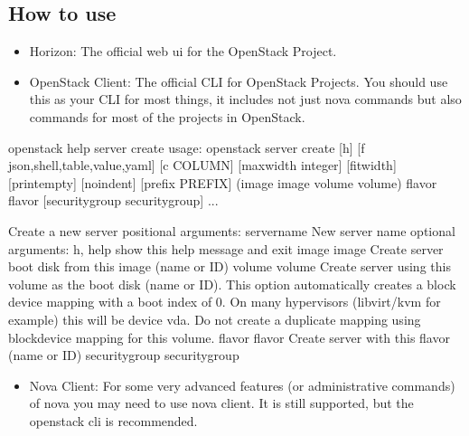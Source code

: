 \documentclass[letterpaper,10pt,english]{sphinxmanual}
\begin{document}
\subsection{How to use}
\label{\detokenize{basics/README:id2}}\begin{itemize}
\item {} 
Horizon: The official web ui for the OpenStack Project.

\item {} 
OpenStack Client: The official CLI for OpenStack Projects. You should use this as your CLI for most things, it includes not just nova commands but also commands for most of the projects in OpenStack.

\end{itemize}

\begin{sphinxVerbatim}[commandchars=\\\{\}]
\PYGZdl{} openstack help server create
usage: openstack server create [\PYGZhy{}h] [\PYGZhy{}f \PYGZob{}json,shell,table,value,yaml\PYGZcb{}]
                               [\PYGZhy{}c COLUMN] [\PYGZhy{}\PYGZhy{}max\PYGZhy{}width \PYGZlt{}integer\PYGZgt{}]
                               [\PYGZhy{}\PYGZhy{}fit\PYGZhy{}width] [\PYGZhy{}\PYGZhy{}print\PYGZhy{}empty] [\PYGZhy{}\PYGZhy{}noindent]
                               [\PYGZhy{}\PYGZhy{}prefix PREFIX]
                               (\PYGZhy{}\PYGZhy{}image \PYGZlt{}image\PYGZgt{} \textbar{} \PYGZhy{}\PYGZhy{}volume \PYGZlt{}volume\PYGZgt{}) \PYGZhy{}\PYGZhy{}flavor
                               \PYGZlt{}flavor\PYGZgt{} [\PYGZhy{}\PYGZhy{}security\PYGZhy{}group \PYGZlt{}security\PYGZhy{}group\PYGZgt{}]
...

Create a new server
positional arguments:
  \PYGZlt{}server\PYGZhy{}name\PYGZgt{}         New server name
optional arguments:
  \PYGZhy{}h, \PYGZhy{}\PYGZhy{}help            show this help message and exit
  \PYGZhy{}\PYGZhy{}image \PYGZlt{}image\PYGZgt{}       Create server boot disk from this image (name or ID)
  \PYGZhy{}\PYGZhy{}volume \PYGZlt{}volume\PYGZgt{}     Create server using this volume as the boot disk (name
                        or ID).
                        This option automatically creates a block device
                        mapping with a boot index of 0. On many hypervisors
                        (libvirt/kvm for example) this will be device vda. Do
                        not create a duplicate mapping using \PYGZhy{}\PYGZhy{}block\PYGZhy{}device\PYGZhy{}
                        mapping for this volume.
  \PYGZhy{}\PYGZhy{}flavor \PYGZlt{}flavor\PYGZgt{}     Create server with this flavor (name or ID)
  \PYGZhy{}\PYGZhy{}security\PYGZhy{}group \PYGZlt{}security\PYGZhy{}group\PYGZgt{}
\end{sphinxVerbatim}
\begin{itemize}
\item {} 
Nova Client: For some very advanced features (or administrative commands) of nova you may need to use nova client. It is still supported, but the openstack cli is recommended.

\end{itemize}
\end{document}
